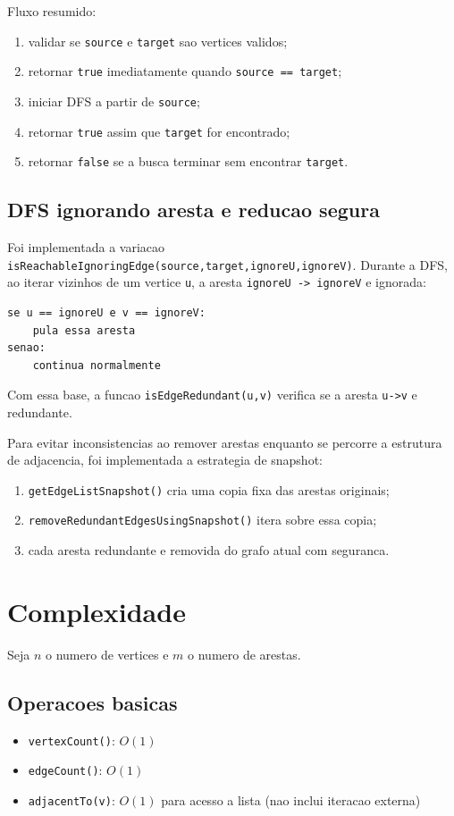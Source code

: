 \documentclass[12pt,a4paper]{article}
\begin{document}
Fluxo resumido:
\begin{enumerate}
    \item validar se \texttt{source} e \texttt{target} sao vertices validos;
    \item retornar \texttt{true} imediatamente quando \texttt{source == target};
    \item iniciar DFS a partir de \texttt{source};
    \item retornar \texttt{true} assim que \texttt{target} for encontrado;
    \item retornar \texttt{false} se a busca terminar sem encontrar \texttt{target}.
\end{enumerate}

\subsection{DFS ignorando aresta e reducao segura}
Foi implementada a variacao \texttt{isReachableIgnoringEdge(source,target,ignoreU,ignoreV)}. Durante a DFS, ao iterar vizinhos de um vertice \texttt{u}, a aresta \texttt{ignoreU -> ignoreV} e ignorada:
\begin{verbatim}
se u == ignoreU e v == ignoreV:
    pula essa aresta
senao:
    continua normalmente
\end{verbatim}

Com essa base, a funcao \texttt{isEdgeRedundant(u,v)} verifica se a aresta \texttt{u->v} e redundante.

Para evitar inconsistencias ao remover arestas enquanto se percorre a estrutura de adjacencia, foi implementada a estrategia de snapshot:
\begin{enumerate}
    \item \texttt{getEdgeListSnapshot()} cria uma copia fixa das arestas originais;
    \item \texttt{removeRedundantEdgesUsingSnapshot()} itera sobre essa copia;
    \item cada aresta redundante e removida do grafo atual com seguranca.
\end{enumerate}

\section{Complexidade}
Seja $n$ o numero de vertices e $m$ o numero de arestas.

\subsection{Operacoes basicas}
\begin{itemize}
    \item \texttt{vertexCount()}: $O(1)$
    \item \texttt{edgeCount()}: $O(1)$
    \item \texttt{adjacentTo(v)}: $O(1)$ para acesso a lista (nao inclui iteracao externa)
\end{itemize}
\end{document}
